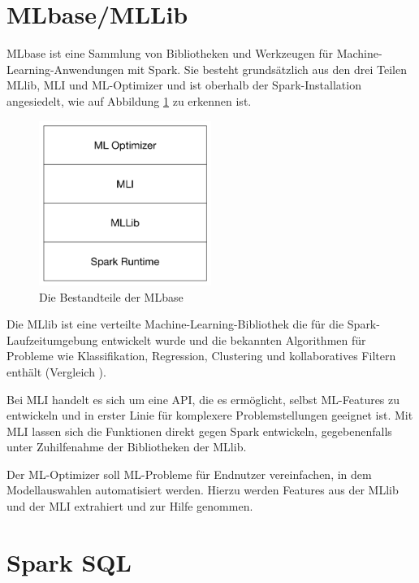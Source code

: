 \section{MLbase/MLLib}
\label{section:mLbase/MLLib}


MLbase ist eine Sammlung von Bibliotheken und Werkzeugen für Machine-Learning-Anwendungen mit Spark. Sie besteht grundsätzlich aus den drei Teilen MLlib, MLI und ML-Optimizer und ist oberhalb der Spark-Installation angesiedelt, wie auf Abbildung \ref{fig:mlbase} zu erkennen ist. 

\begin{figure}[htb!]
\centering
\includegraphics[width=0.5\textwidth]{bilder/2_4_3_mlbase.png}
\caption{Die Bestandteile der MLbase }
\label{fig:mlbase}
\end{figure} 
 


Die MLlib ist eine verteilte Machine-Learning-Bibliothek die für die Spark-Laufzeitumgebung entwickelt wurde und die bekannten Algorithmen für Probleme wie Klassifikation, Regression, Clustering und kollaboratives Filtern enthält (Vergleich ).

Bei MLI handelt es sich um eine API, die es ermöglicht, selbst ML-Features zu entwickeln und in erster Linie für komplexere Problemstellungen geeignet ist. Mit MLI lassen sich die Funktionen direkt gegen Spark entwickeln, gegebenenfalls unter Zuhilfenahme der Bibliotheken der MLlib.

Der ML-Optimizer soll ML-Probleme für Endnutzer vereinfachen, in dem Modellauswahlen automatisiert werden. Hierzu werden Features aus der MLlib und der MLI extrahiert und zur Hilfe genommen.



\section{Spark SQL}
\label{section:spark SQL}


